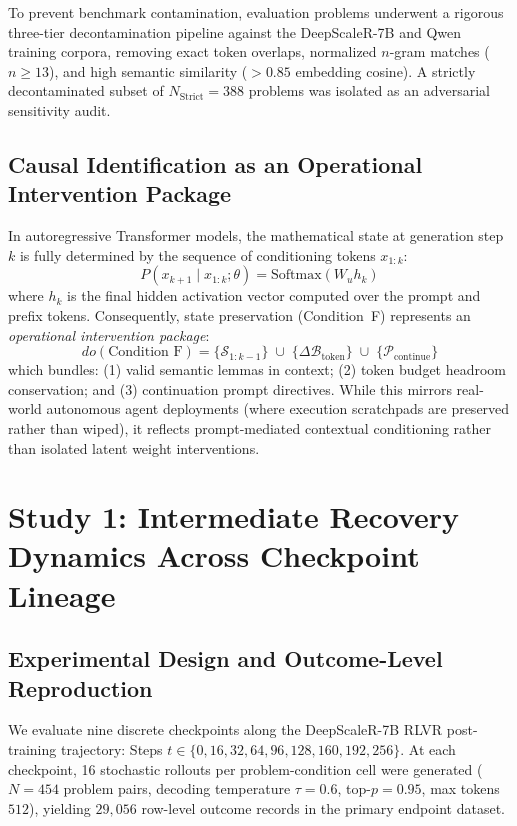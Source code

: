 \documentclass[11pt]{article}
\begin{document}
To prevent benchmark contamination, evaluation problems underwent a rigorous three-tier decontamination pipeline against the DeepScaleR-7B and Qwen training corpora, removing exact token overlaps, normalized $n$-gram matches ($n \ge 13$), and high semantic similarity ($> 0.85$ embedding cosine). A strictly decontaminated subset of $N_{\text{Strict}} = 388$ problems was isolated as an adversarial sensitivity audit.

\subsection{Causal Identification as an Operational Intervention Package}
In autoregressive Transformer models, the mathematical state at generation step $k$ is fully determined by the sequence of conditioning tokens $x_{1:k}$:
\begin{equation}
P(x_{k+1} \mid x_{1:k}; \theta) = \text{Softmax}(W_u h_k)
\end{equation}
where $h_k$ is the final hidden activation vector computed over the prompt and prefix tokens. Consequently, state preservation (Condition~F) represents an \emph{operational intervention package}:
\begin{equation}
do(\text{Condition F}) = \{\mathcal{S}_{1:k-1}\} \;\cup\; \{\Delta \mathcal{B}_{\text{token}}\} \;\cup\; \{\mathcal{P}_{\text{continue}}\}
\end{equation}
which bundles: (1) valid semantic lemmas in context; (2) token budget headroom conservation; and (3) continuation prompt directives. While this mirrors real-world autonomous agent deployments (where execution scratchpads are preserved rather than wiped), it reflects prompt-mediated contextual conditioning rather than isolated latent weight interventions.

\section{Study 1: Intermediate Recovery Dynamics Across Checkpoint Lineage}
\label{sec:study1_lineage}

\subsection{Experimental Design and Outcome-Level Reproduction}
We evaluate nine discrete checkpoints along the DeepScaleR-7B RLVR post-training trajectory: Steps $t \in \{0, 16, 32, 64, 96, 128, 160, 192, 256\}$. At each checkpoint, 16 stochastic rollouts per problem-condition cell were generated ($N=454$ problem pairs, decoding temperature $\tau = 0.6$, top-$p = 0.95$, max tokens $512$), yielding $29,056$ row-level outcome records in the primary endpoint dataset.
\end{document}
